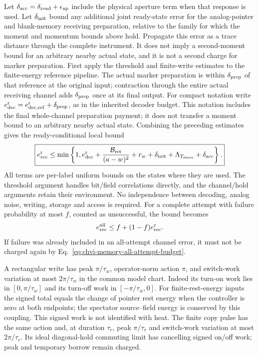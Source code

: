 Let $\delta_{\rm acc}=\delta_{\rm read}+\epsilon_{\rm ap}$ include
the physical aperture term when that response is used. Let $\delta_{\rm init}$
bound any additional joint ready-state error for
the analog-pointer and blank-memory receiving preparation, relative to
the family for which the moment and momentum bounds above hold. Propagate
this error as a trace distance through the complete instrument. It does
not imply a second-moment bound for an arbitrary nearby actual state,
and it is not a second charge for marker preparation. First apply the
threshold and finite-write estimates to the finite-energy reference pipeline.
The actual marker preparation is within $\delta_{\rm prep}$ of that
reference at the original input; contraction through the entire actual
receiving channel adds $\delta_{\rm prep}$ once at its final output.
For compact notation write
$e_{\rm dec}^{\rm r}=e_{\rm dec,ref}^{\rm r}+\delta_{\rm prep}$,
as in the inherited decoder budget. This notation includes the final
whole-channel preparation payment; it does not transfer a moment bound
to an arbitrary nearby actual state.
Combining the preceding estimates gives the ready-conditional local bound
\begin{equation}
 \boxed{\begin{gathered}
 e_{\rm rec}^{\rm r}
 \leq\min\left\{1,
 e_{\rm dec}^{\rm r}
 +\frac{\mathcal B_{\rm ret}}{(a-w)^2}
 +r_w+\delta_{\rm init}+\Lambda_{T_{\rm store}}+\delta_{\rm acc}
 \right\}.
 \end{gathered}}
\label{eq:chvi-memory-ready-budget}
\end{equation}
All terms are per-label uniform bounds on the states where they are used.
The threshold argument handles bit/field correlations directly, and the
channel/hold arguments retain their environment. No independence between
decoding, analog noise, writing, storage and access is required.
For a complete attempt with failure probability at most $f$, counted as
unsuccessful, the bound becomes
\begin{equation}
 e_{\rm rec}^{\rm all}\leq f+(1-f)e_{\rm rec}^{\rm r}.
\label{eq:chvi-memory-all-attempt-budget}
\end{equation}
If failure was already included in an all-attempt channel error, it must
not be charged again by Eq.~\eqref{eq:chvi-memory-all-attempt-budget}.

A rectangular write has peak $\pi/\tau_w$, operator-norm action $\pi$,
and switch-work variation at most $2\pi/\tau_w$ in the common model chart.
Indeed its turn-on work lies in $[0,\pi/\tau_w]$ and its turn-off work in
$[-\pi/\tau_w,0]$. For finite-rest-energy inputs the signed total equals
the change of pointer rest
energy when the controller is zero at both endpoints; the spectator
source--field energy is conserved by this coupling. This signed work is
not identified with heat. The finite copy pulse has the same action and,
at duration $\tau_r$, peak $\pi/\tau_r$ and switch-work variation at most
$2\pi/\tau_r$. Its ideal diagonal-hold commuting limit has cancelling
signed on/off work; peak and temporary borrow remain charged.

